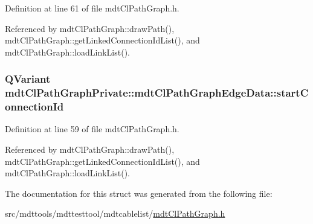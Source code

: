 Definition at line 61 of file mdt\-Cl\-Path\-Graph.\-h.



Referenced by mdt\-Cl\-Path\-Graph\-::draw\-Path(), mdt\-Cl\-Path\-Graph\-::get\-Linked\-Connection\-Id\-List(), and mdt\-Cl\-Path\-Graph\-::load\-Link\-List().

\hypertarget{structmdt_cl_path_graph_private_1_1mdt_cl_path_graph_edge_data_a4d17d73e0bbc09b541b91a9ca1cad8da}{
\subsubsection[{start\-Connection\-Id}]{\setlength{\rightskip}{0pt plus 5cm}Q\-Variant mdt\-Cl\-Path\-Graph\-Private\-::mdt\-Cl\-Path\-Graph\-Edge\-Data\-::start\-Connection\-Id}}\label{structmdt_cl_path_graph_private_1_1mdt_cl_path_graph_edge_data_a4d17d73e0bbc09b541b91a9ca1cad8da}


Definition at line 59 of file mdt\-Cl\-Path\-Graph.\-h.



Referenced by mdt\-Cl\-Path\-Graph\-::draw\-Path(), mdt\-Cl\-Path\-Graph\-::get\-Linked\-Connection\-Id\-List(), and mdt\-Cl\-Path\-Graph\-::load\-Link\-List().



The documentation for this struct was generated from the following file\-:\begin{DoxyCompactItemize}
\item 
src/mdttools/mdttesttool/mdtcablelist/\hyperlink{mdt_cl_path_graph_8h}{mdt\-Cl\-Path\-Graph.\-h}\end{DoxyCompactItemize}
